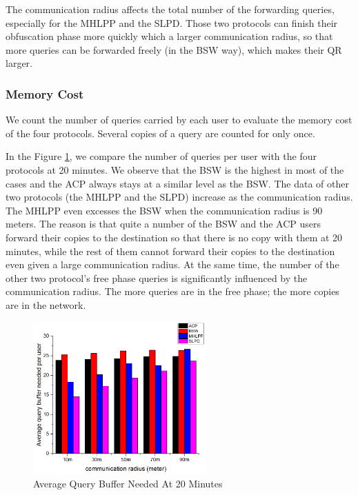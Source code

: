 \documentclass[conference]{IEEEtran}
\begin{document}
The communication radius affects the total number of the forwarding queries, especially for the MHLPP and the SLPD. Those two protocols can finish their obfuscation phase more quickly which a larger communication radius, so that more queries can be forwarded freely (in the BSW way), which makes their QR larger.

\subsubsection{ Memory Cost}

We count the number of queries carried by each user to evaluate the memory cost of the four protocols. Several copies of a query are counted for only once.

In the Figure \ref{fig:F419AverageQueryBufferNeededAt20Minutes}, we compare the number of queries per user with the four protocols at 20 minutes. We observe that the BSW is the highest in most of the cases and the ACP always stays at a similar level as the BSW. The data of other two protocols (the MHLPP and the SLPD) increase as the communication radius. The MHLPP even excesses the BSW when the communication radius is 90 meters. The reason is that quite a number of the BSW and the ACP users forward their copies to the destination so that there is no copy with them at 20 minutes, while the rest of them cannot forward their copies to the destination even given a large communication radius. At the same time, the number of the other two protocol's free phase queries is significantly influenced by the communication radius. The more queries are in the free phase; the more copies are in the network.

\begin{figure} [H]
  \centering 
  \includegraphics[width=2.6in]{figures/F419AverageQueryBufferNeededAt20Minutes.png}
  \caption{Average Query Buffer Needed At 20 Minutes} 
  \label{fig:F419AverageQueryBufferNeededAt20Minutes} %
\end{figure}
\end{document}
